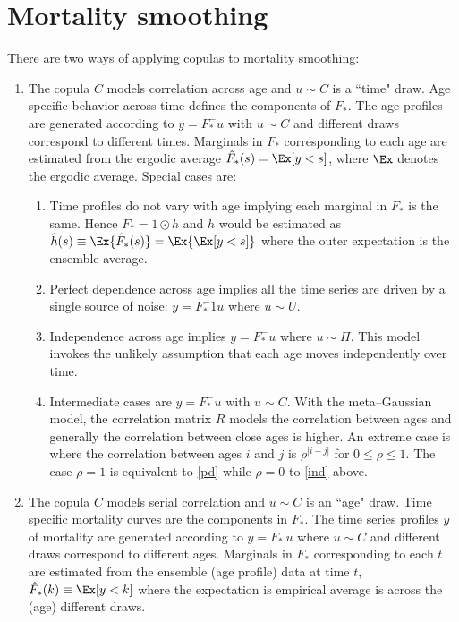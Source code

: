 \section{Mortality smoothing}

There are two ways of applying copulas to mortality smoothing:
\begin{enumerate}
    \item The copula $C$ models correlation across age and $u\sim C$ is a ``time" draw. Age specific  behavior across time defines the components of $F_*$.  The age profiles are generated according to $y=F_*^-u$ with $u\sim C$ and different draws correspond to different times. Marginals in $F_*$ corresponding to each age  are estimated from the ergodic average
$
\hat F_*(s) =\Ex[y<s]
$, where $\Ex$ denotes the ergodic average.
Special cases are:
    \begin{enumerate}
        \item Time profiles do not vary with age implying each marginal in $F_*$ is the same.  Hence $F_*=1\odot h$ and $h$ would be estimated as $\hat h(s)\equiv\Ex\{\hat F_*(s)\}=\Ex\{\Ex[y<s]\}$ where the outer expectation is the ensemble average.
        \item \label{pd} Perfect dependence across age implies all the time series are driven by a single source of noise: $y= F_*^-1u$ where $u\sim U$.
        \item \label{ind} Independence across age implies $ y= F_*^-u$  where $u\sim \Pi$.  This model invokes the unlikely assumption that each age moves independently over time.
        \item   Intermediate cases are  $ y=F_*^-u$ with $u\sim C$.   With the meta--Gaussian model, the correlation matrix $R$ models the correlation between ages and generally the correlation between close ages is  higher.   An extreme case is where the correlation between ages $i$ and $j$ is $\rho^{|i-j|}$ for $0\le\rho\le 1$.  The case $\rho=1$ is equivalent to \ref{pd} while $\rho=0$ to \ref{ind} above.
    \end{enumerate}        
    \item The copula $C$ models serial correlation and $u\sim C$ is an ``age" draw.  Time specific mortality curves are the components in $F_*$.   The time series profiles $y$ of mortality are generated  according to $y=F_*^-u$ where $u\sim C$ and different draws correspond to different ages.  Marginals in $F_*$ corresponding to each $t$ are estimated from the ensemble (age profile) data at time $t$, $\hat F_*(k)\equiv\Ex[y<k]$ where the expectation is empirical average is across the (age) different draws.

\end{enumerate}
